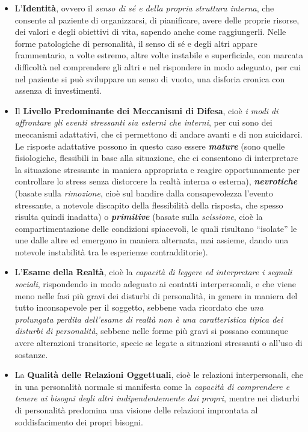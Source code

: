 \begin{itemize}
\item
  L'\textbf{Identità}, ovvero il \emph{senso di sé e della propria
  struttura interna}, che consente al paziente di organizzarsi, di
  pianificare, avere delle proprie risorse, dei valori e degli obiettivi
  di vita, sapendo anche come raggiungerli. Nelle forme patologiche di
  personalità, il senso di sé e degli altri appare frammentario, a volte
  estremo, altre volte instabile e superficiale, con marcata difficoltà
  nel comprendere gli altri e nel rispondere in modo adeguato, per cui
  nel paziente si può sviluppare un senso di vuoto, una disforia cronica
  con assenza di investimenti.
\item
  Il \textbf{Livello Predominante dei Meccanismi di Difesa}, cioè
  \emph{i modi di affrontare gli eventi stressanti sia esterni che
  interni}, per cui sono dei meccanismi adattativi, che ci permettono di
  andare avanti e di non suicidarci. Le risposte adattative possono in
  questo caso essere \textbf{\emph{mature}} (sono quelle fisiologiche,
  flessibili in base alla situazione, che ci consentono di interpretare
  la situazione stressante in maniera appropriata e reagire
  opportunamente per controllare lo stress senza distorcere la realtà
  interna o esterna), \textbf{\emph{nevrotiche}} (basate sulla
  \emph{rimozione}, cioè sul bandire dalla consapevolezza l'evento
  stressante, a notevole discapito della flessibilità della risposta,
  che spesso risulta quindi inadatta) o \textbf{\emph{primitive}}
  (basate sulla \emph{scissione}, cioè la compartimentazione delle
  condizioni spiacevoli, le quali risultano ``isolate'' le une dalle
  altre ed emergono in maniera alternata, mai assieme, dando una
  notevole instabilità tra le esperienze contradditorie).
\item
  L'\textbf{Esame della Realtà}, cioè la \emph{capacità di leggere ed
  interpretare i segnali sociali}, rispondendo in modo adeguato ai
  contatti interpersonali, e che viene meno nelle fasi più gravi dei
  disturbi di personalità, in genere in maniera del tutto inconsapevole
  per il soggetto, sebbene vada ricordato che \emph{una prolungata
  perdita dell'esame di realtà non è una caratteristica tipica dei
  disturbi di personalità}, sebbene nelle forme più gravi si possano
  comunque avere alterazioni transitorie, specie se legate a situazioni
  stressanti o all'uso di sostanze.
\item
  La \textbf{Qualità delle Relazioni Oggettuali}, cioè le relazioni
  interpersonali, che in una personalità normale si manifesta come la
  \emph{capacità di comprendere e tenere ai bisogni degli altri
  indipendentemente dai propri}, mentre nei disturbi di personalità
  predomina una visione delle relazioni improntata al soddisfacimento
  dei propri bisogni.
\end{itemize}

